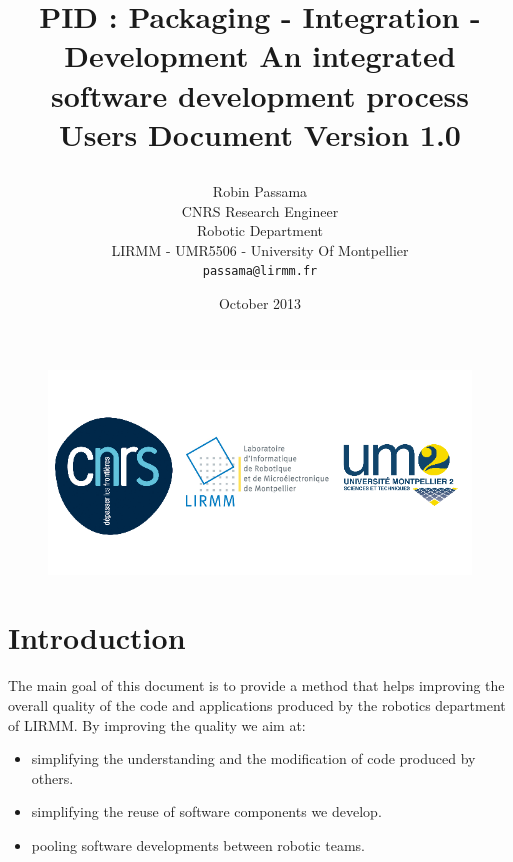 \documentclass[12pt,a4paper]{article}
\begin{document}
\title{%
    \begin{minipage}\linewidth
        \centering\bfseries\sffamily
        PID : Packaging - Integration - Development 
        \vskip3pt
        \large An integrated software development process
        	\vskip3pt
        	\large Users Document
        	\vskip3pt
        \normalsize	Version 1.0        	
    \end{minipage}
}

\author{
	Robin Passama\\
	CNRS Research Engineer\\
	Robotic Department\\	
	LIRMM - UMR5506 - University Of Montpellier\\	
	\texttt{passama@lirmm.fr}}
\date{October 2013}

\maketitle

\bigskip
\bigskip
\bigskip
\bigskip
\bigskip
\bigskip

\begin{figure}
\center
\includegraphics[scale=0.7]{images/logos_officiels.png}
\end{figure}


\pagebreak

\part*{Introduction}
The main goal of this document is to provide a method that helps improving the overall quality of the code and applications produced by the robotics department of LIRMM. By improving the quality we aim at:
\begin{itemize}
\item simplifying the understanding and the modification of code produced by others.
\item simplifying the reuse of software components we develop.
\item pooling software developments between robotic teams.
\end{itemize}
\end{document}
